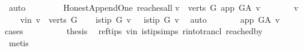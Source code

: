 \begin{isabellebody}
\ auto\ \isanewline
\ \ \isamarkupfalse%
\ \ \isanewline
{}\isamarkupfalse%
%
\endisatagproof
{\isafoldproof}%
%
\isadelimproof
%
\endisadelimproof
%
\isadelimdocument
%
\endisadelimdocument
%
\isatagdocument
%
\isamarkuptrue%
%
\endisatagdocument
{\isafolddocument}%
%
\isadelimdocument
%
\endisadelimdocument
{}\isamarkupfalse%
\ {\isacharparenleft}{\kern0pt}\ Honest{\isacharunderscore}{\kern0pt}Append{\isacharunderscore}{\kern0pt}One{\isacharparenright}{\kern0pt}\ reaches{\isacharunderscore}{\kern0pt}all{\isacharcolon}{\kern0pt}\isanewline
{\isachardoublequoteopen}{\isasymforall}v\ {\isasymin}\ verts\ G{\isachardot}{\kern0pt}\ app\ {\isasymrightarrow}\isactrlsup {\isacharplus}{\kern0pt}\isactrlbsub G{\isacharunderscore}{\kern0pt}A\isactrlesub \ v{\isachardoublequoteclose}\ \ \isanewline
%
\isadelimproof
%
\endisadelimproof
%
\isatagproof
{}\isamarkupfalse%
\ \isanewline
\ \ \isamarkupfalse%
\ v\ \isanewline
\ \ \isamarkupfalse%
\ v{\isacharunderscore}{\kern0pt}in{\isacharcolon}{\kern0pt}\ {\isachardoublequoteopen}v\ {\isasymin}\ verts\ G{\isachardoublequoteclose}\isanewline
\ \ \isamarkupfalse%
\ {\isachardoublequoteopen}is{\isacharunderscore}{\kern0pt}tip\ G\ v{\isachardoublequoteclose}\ {\isacharbar}{\kern0pt}\ {\isachardoublequoteopen}{\isasymnot}\ is{\isacharunderscore}{\kern0pt}tip\ G\ v{\isachardoublequoteclose}\ \isamarkupfalse%
\ auto\isanewline
\ \ \ \ \isamarkupfalse%
\ \isamarkupfalse%
\ {\isachardoublequoteopen}app\ {\isasymrightarrow}\isactrlsup {\isacharplus}{\kern0pt}\isactrlbsub G{\isacharunderscore}{\kern0pt}A\isactrlesub \ v{\isachardoublequoteclose}\isanewline
\ \ \isamarkupfalse%
{\isacharparenleft}{\kern0pt}cases{\isacharparenright}{\kern0pt}\isanewline
\ \ \isamarkupfalse%
\ {}\isanewline
\ \ \isamarkupfalse%
\ \isamarkupfalse%
\ {\isacharquery}{\kern0pt}thesis\ \isamarkupfalse%
\ ref{\isacharunderscore}{\kern0pt}tips\ v{\isacharunderscore}{\kern0pt}in\ is{\isacharunderscore}{\kern0pt}tip{\isachardot}{\kern0pt}simps\ r{\isacharunderscore}{\kern0pt}into{\isacharunderscore}{\kern0pt}trancl{\isacharprime}{\kern0pt}\ reached{\isacharunderscore}{\kern0pt}by\isanewline
\ \ \ \ \isamarkupfalse%
\ {\isacharparenleft}{\kern0pt}metis{\isacharparenright}{\kern0pt}\ \isanewline
\ \ \isamarkupfalse%

\end{isabellebody}
